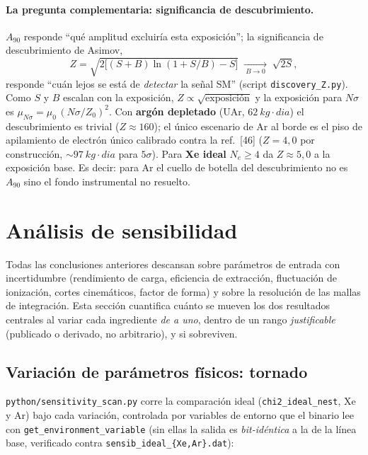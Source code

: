 \documentclass[11pt,a4paper]{article}
\newcommand{\Ne}{N_{e}}
\newcommand{\code}[1]{\texttt{#1}}
\begin{document}
\paragraph{La pregunta complementaria: significancia de descubrimiento.}
$A_{90}$ responde ``qu\'e amplitud excluir\'ia esta exposici\'on''; la
significancia de descubrimiento de Asimov,
\begin{equation}
  \label{eq:Z_asimov}
  Z = \sqrt{2\bigl[(S+B)\ln(1+S/B)-S\bigr]}
  \;\xrightarrow[\ B\to0\ ]{}\; \sqrt{2S},
\end{equation}
responde ``cu\'an lejos se est\'a de \emph{detectar} la se\~nal SM'' (script
\code{discovery\_Z.py}). Como $S$ y $B$ escalan con la exposici\'on,
$Z\propto\sqrt{\text{exposici\'on}}$ y la exposici\'on para $N\sigma$ es
$\mu_{N\sigma}=\mu_{0}\,(N\sigma/Z_{0})^{2}$. Con \textbf{arg\'on depletado}
(UAr, $\SI{62}{kg\cdot dia}$) el descubrimiento es trivial ($Z\approx160$); el
\'unico escenario de Ar al borde es el piso de apilamiento de electr\'on \'unico
calibrado contra la ref.\ [46] ($Z=4{,}0$ por construcci\'on, $\sim\SI{97}{kg\cdot
dia}$ para $5\sigma$). Para \textbf{Xe ideal} $\Ne\ge4$ da $Z\approx5{,}0$ a la
exposici\'on base. Es decir: para Ar el cuello de botella del descubrimiento no
es $A_{90}$ sino el fondo instrumental no resuelto.

\section{An\'alisis de sensibilidad}
\label{sec:sensib_analisis}

Todas las conclusiones anteriores descansan sobre par\'ametros de entrada con
incertidumbre (rendimiento de carga, eficiencia de extracci\'on, fluctuaci\'on de
ionizaci\'on, cortes cinem\'aticos, factor de forma) y sobre la resoluci\'on de
las mallas de integraci\'on. Esta secci\'on cuantifica cu\'anto se mueven los dos
resultados centrales al variar cada ingrediente \emph{de a uno}, dentro de un
rango \emph{justificable} (publicado o derivado, no arbitrario), y si sobreviven.

\subsection{Variaci\'on de par\'ametros f\'isicos: tornado}
\label{sec:tornado}

\code{python/sensitivity\_scan.py} corre la comparaci\'on ideal
(\code{chi2\_ideal\_nest}, Xe y Ar) bajo cada variaci\'on, controlada por
variables de entorno que el binario lee con \code{get\_environment\_variable}
(sin ellas la salida es \emph{bit-id\'entica} a la de la l\'inea base, verificado
contra \code{sensib\_ideal\_\{Xe,Ar\}.dat}):
\end{document}
